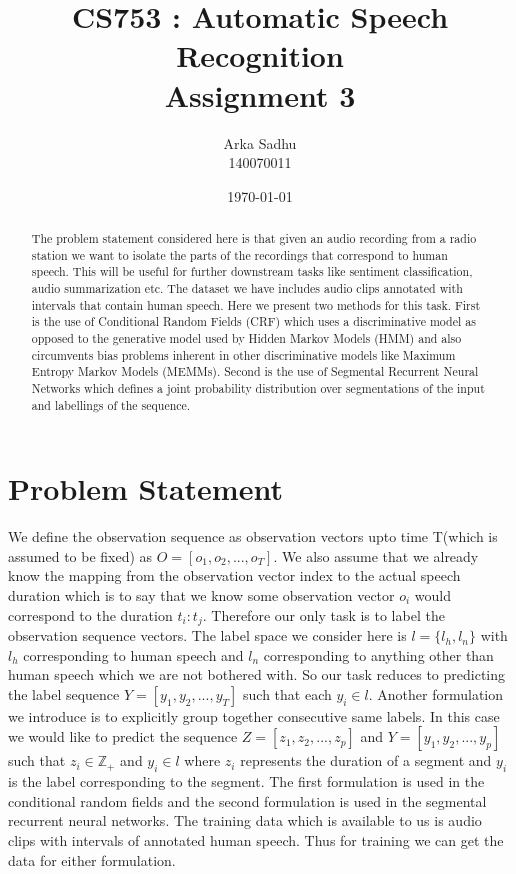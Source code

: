 \documentclass[letterpaper]{article} %
\begin{document}
%
 \title{CS753 : Automatic Speech Recognition \\ Assignment 3}
 \author{Arka Sadhu\\
   140070011
 }
 \date{\today}
\maketitle
\begin{abstract}
  The problem statement considered here is that given an audio recording from a radio station we want to isolate the parts of the recordings that correspond to human speech. This will be useful for further downstream tasks like sentiment classification, audio summarization etc. The dataset we have includes audio clips annotated with intervals that contain human speech. Here we present two methods for this task. First is the use of Conditional Random Fields (CRF) which uses a discriminative model as opposed to the generative model used by Hidden Markov Models (HMM) and also circumvents bias problems inherent in other discriminative models like Maximum Entropy Markov Models (MEMMs). Second is the use of Segmental Recurrent Neural Networks which defines a joint probability distribution over segmentations of the input and labellings of the sequence.
\end{abstract}

\section{Problem Statement}
We define the observation sequence as observation vectors upto time T(which is assumed to be fixed) as $O = [o_1, o_2, ... , o_T]$. We also assume that we already know the mapping from the observation vector index to the actual speech duration which is to say that we know some observation vector $o_i$ would correspond to the duration $t_i:t_j$. Therefore our only task is to label the observation sequence vectors. The label space we consider here is $l = \{l_h, l_n\}$ with $l_h$ corresponding to human speech and $l_n$ corresponding to anything other than human speech which we are not bothered with. So our task reduces to predicting the label sequence $Y = [y_1, y_2, ... , y_T]$ such that each $y_i \in l$. Another formulation we introduce is to explicitly group together consecutive same labels. In this case we would like to predict the sequence $Z = [z_1, z_2, ..., z_p]$ and $Y = [y_1, y_2, ..., y_p]$ such that $z_i \in \mathbb{Z_{+}}$ and $y_i \in l$ where $z_i$ represents the duration of a segment and $y_i$ is the label corresponding to the segment. The first formulation is used in the conditional random fields and the second formulation is used in the segmental recurrent neural networks. The training data which is available to us is audio clips with intervals of annotated human speech. Thus for training we can get the data for either formulation.
\end{document}
